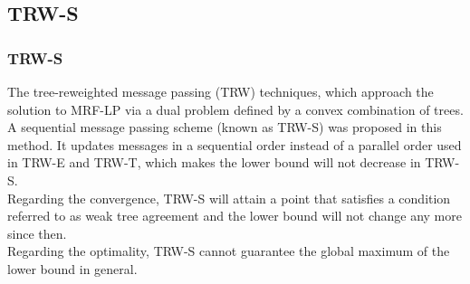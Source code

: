 \documentclass{article} %
\begin{document}
	\subsection{TRW-S}
		\subsubsection{TRW-S\cite{wang2013markov}}
        The tree-reweighted message passing (TRW) techniques\cite{kolmogorov2006convergent}, which approach the solution to MRF-LP via a dual problem defined by a convex combination of trees.\\
        A sequential message passing scheme (known as TRW-S) was proposed in this method. It updates messages in a sequential order instead of a parallel order used in TRW-E and TRW-T, which makes the lower bound will not decrease in TRW-S.\\
        Regarding the convergence, TRW-S will attain a point that satisfies a condition referred to as weak tree agreement and the lower bound will not change any more since then.\\
        Regarding the optimality, TRW-S cannot guarantee the global maximum of the lower bound in general.
\end{document}
